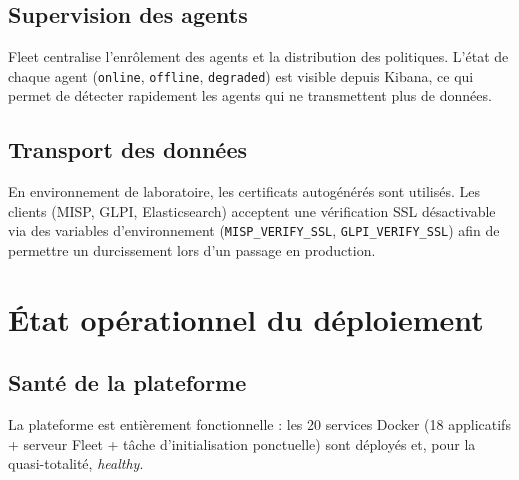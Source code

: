 \subsection{Supervision des agents}

Fleet centralise l'enr\^olement des agents et la distribution des politiques.
L'\'etat de chaque agent (\texttt{online}, \texttt{offline}, \texttt{degraded})
est visible depuis Kibana, ce qui permet de d\'etecter rapidement les agents
qui ne transmettent plus de donn\'ees.

\subsection{Transport des donn\'ees}

En environnement de laboratoire, les certificats autog\'en\'er\'es sont
utilis\'es. Les clients (MISP, GLPI, Elasticsearch) acceptent une
v\'erification SSL d\'esactivable via des variables d'environnement
(\texttt{MISP\_VERIFY\_SSL}, \texttt{GLPI\_VERIFY\_SSL}) afin de permettre un
durcissement lors d'un passage en production.

\clearpage

\section{\'Etat op\'erationnel du d\'eploiement}

\subsection{Sant\'e de la plateforme}

La plateforme est enti\`erement fonctionnelle : les 20 services Docker
(18 applicatifs + serveur Fleet + t\^ache d'initialisation ponctuelle) sont
d\'eploy\'es et, pour la quasi-totalit\'e, \emph{healthy}.

